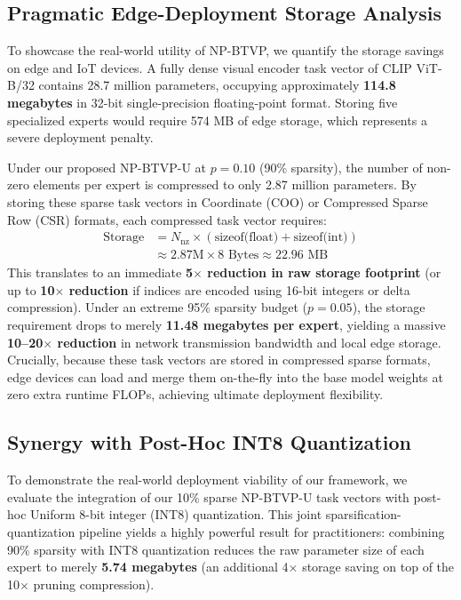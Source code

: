 \subsection{Pragmatic Edge-Deployment Storage Analysis}
To showcase the real-world utility of NP-BTVP, we quantify the storage savings on edge and IoT devices. A fully dense visual encoder task vector of CLIP ViT-B/32 contains 28.7 million parameters, occupying approximately \textbf{114.8 megabytes} in 32-bit single-precision floating-point format. Storing five specialized experts would require 574 MB of edge storage, which represents a severe deployment penalty.

Under our proposed NP-BTVP-U at $p=0.10$ (90\% sparsity), the number of non-zero elements per expert is compressed to only 2.87 million parameters. By storing these sparse task vectors in Coordinate (COO) or Compressed Sparse Row (CSR) formats, each compressed task vector requires:
\begin{align}
\text{Storage} &= N_{\text{nz}} \times (\text{sizeof(float)} + \text{sizeof(int)}) \nonumber \\
&\approx 2.87\text{M} \times 8\text{ Bytes} \approx 22.96\text{ MB}
\end{align}
This translates to an immediate \textbf{5$\times$ reduction in raw storage footprint} (or up to \textbf{10$\times$ reduction} if indices are encoded using 16-bit integers or delta compression). Under an extreme 95\% sparsity budget ($p=0.05$), the storage requirement drops to merely \textbf{11.48 megabytes per expert}, yielding a massive \textbf{10--20$\times$ reduction} in network transmission bandwidth and local edge storage. Crucially, because these task vectors are stored in compressed sparse formats, edge devices can load and merge them on-the-fly into the base model weights at zero extra runtime FLOPs, achieving ultimate deployment flexibility.

\subsection{Synergy with Post-Hoc INT8 Quantization}
To demonstrate the real-world deployment viability of our framework, we evaluate the integration of our 10\% sparse NP-BTVP-U task vectors with post-hoc Uniform 8-bit integer (INT8) quantization. This joint sparsification-quantization pipeline yields a highly powerful result for practitioners: combining 90\% sparsity with INT8 quantization reduces the raw parameter size of each expert to merely \textbf{5.74 megabytes} (an additional 4$\times$ storage saving on top of the 10$\times$ pruning compression). 


